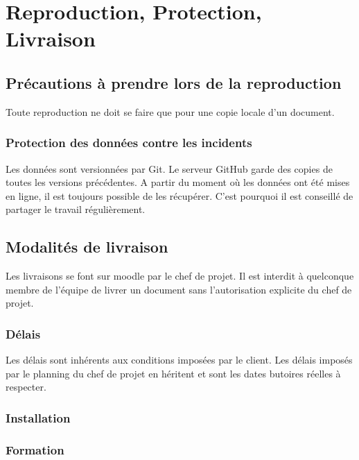 \section{Reproduction, Protection, Livraison}

\subsection{Précautions à prendre lors de la reproduction}
Toute reproduction ne doit se faire que pour une copie locale d'un document.

\subsubsection{Protection des données contre les incidents}
Les données sont versionnées par Git. Le serveur GitHub garde des copies de toutes les versions précédentes.
A partir du moment où les données ont été mises en ligne, il est toujours possible de les récupérer.
C'est pourquoi il est conseillé de partager le travail régulièrement.

\subsection{Modalités de livraison}
Les livraisons se font sur moodle par le chef de projet.
Il est interdit à quelconque membre de l'équipe de livrer un document sans l'autorisation explicite du chef de projet.

\subsubsection{Délais}
Les délais sont inhérents aux conditions imposées par le client. Les délais imposés par le
planning du chef de projet en héritent et sont les dates butoires réelles à respecter. 

\subsubsection{Installation}


\subsubsection{Formation}

\vfill
\pagebreak
